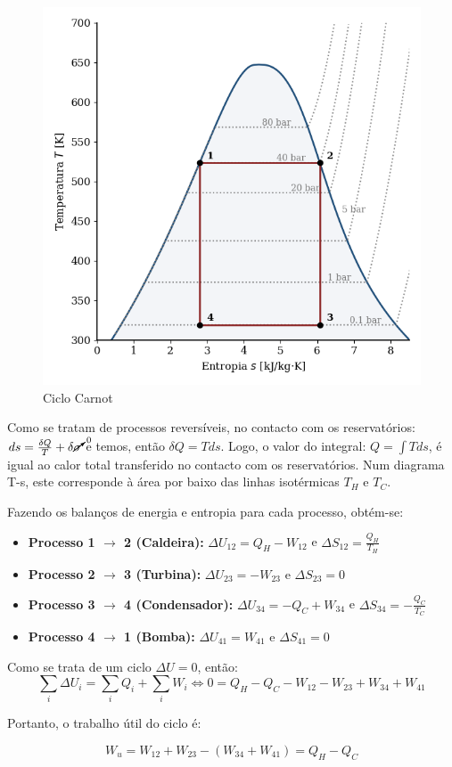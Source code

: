 \begin{figure}[H]
    \centering
    \includegraphics[width=0.45\linewidth]{graphs/carnot-Ts-ideal.png}
    \caption{Ciclo Carnot}
    \label{fig:carnot-Ts}
\end{figure}

Como se tratam de processos reversíveis, no contacto com os reservatórios: $ds = \frac{\delta Q}{T} + \delta \cancelto{0}{\sigma}$ e temos, então $\delta Q = T ds$. Logo, o valor do integral: $Q = \int T ds$, é igual ao calor total transferido no contacto com os reservatórios. Num diagrama T-s, este corresponde à área por baixo das linhas isotérmicas $T_H$ e $T_C$.

Fazendo os balanços de energia e entropia para cada processo, obtém-se:

\begin{itemize}
    \item \textbf{Processo 1 $\rightarrow$ 2 (Caldeira):} $\Delta U_{12} = Q_H - W_{12}$ e $\Delta S_{12} = \frac{Q_{H}}{T_H}$
    \item \textbf{Processo 2 $\rightarrow$ 3 (Turbina):} $\Delta U_{23} = -W_{23}$ e $\Delta S_{23} = 0$
    \item \textbf{Processo 3 $\rightarrow$ 4 (Condensador):} $\Delta U_{34} = -Q_C + W_{34}$ e $\Delta S_{34} = - \frac{Q_{C}}{T_C}$
    \item \textbf{Processo 4 $\rightarrow$ 1 (Bomba):} $\Delta U_{41} = W_{41}$ e $\Delta S_{41} = 0$
\end{itemize}

Como se trata de um ciclo $\Delta U = 0$, então:
\begin{equation*}
    \sum_i \Delta U_i = \sum_i Q_i + \sum_i W_i \Longleftrightarrow 0 = Q_H - Q_C - W_{12} - W_{23} + W_{34} + W_{41}
\end{equation*}

Portanto, o trabalho útil do ciclo é:

\begin{equation}
    W_u = W_{12} + W_{23} - ( W_{34} +  W_{41}) = Q_H - Q_C
\end{equation}

